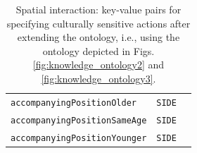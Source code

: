 \documentclass{CSSRforAfrica}
\begin{document}
\begin{table}[H]
\begin{center}
\begin{tabular}{|l l l|}
{\footnotesize \verb+accompanyingPositionOlder+} 	   & {\footnotesize \verb+SIDE+} \vspace{-1mm} & {\footnotesize  } \\
{\footnotesize \verb+accompanyingPositionSameAge+}  & {\footnotesize \verb+SIDE+} \vspace{-1mm} & {\footnotesize  } \\
{\footnotesize \verb+accompanyingPositionYounger+}  & {\footnotesize \verb+SIDE+}  & {\footnotesize  } \\
\hline \hline
\end{tabular}
\end{center}
\caption{Spatial interaction: key-value pairs for specifying culturally sensitive actions after extending the ontology, i.e., using the ontology depicted in Figs. \ref{fig:knowledge_ontology2} and \ref{fig:knowledge_ontology3}.}
\label{table:key-value_pairs1}
\end{table}
\end{document}
